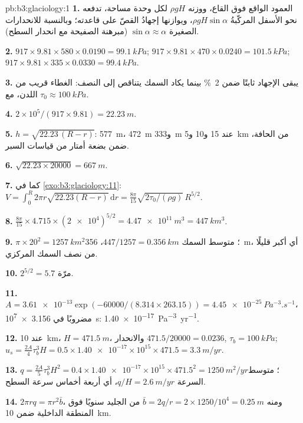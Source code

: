 \begin{solution}{pb:b3:glaciology:1}
\textbf{1.} العمود الواقع فوق القاع، ووزنه $\rho gH$ لكل وحدة مساحة، تدفعه
نحو الأسفل المركّبةُ $\rho gH\sin\alpha$، ويوازنها إجهادُ
القصّ على قاعدته؛ وبالنسبة للانحدارات الصغيرة $\sin\alpha \approx \alpha$ (مبرهنة
الصفيحة مع انحدار السطح).

\textbf{2.} $917\times9.81\times580\times0.0190 = \qty{99.1}{kPa}$;
$917\times9.81\times470\times0.0240 = \qty{101.5}{kPa}$; $917\times9.81
\times335\times0.0330 = \qty{99.4}{kPa}$.

\textbf{3.} يبقى الإجهاد ثابتًا ضمن \qty{2}{\percent} بينما
يكاد السمك يتناقص إلى النصف: الغطاء قريب من اللدن، مع $\tau_0 \approx
\qty{100}{kPa}$.

\textbf{4.} $2\times10^5/(917\times9.81) = \qty{22.23}{m}$.

\textbf{5.} $h = \sqrt{22.23\,(R - r)}$: \qty{577}{m}، \qty{472}{m}
و\qty{333}{m} عند 15 و10 و\qty{5}{km} من الحافة، ضمن بضعة أمتار
من قياسات السبر.

\textbf{6.} $\sqrt{22.23\times20000} = \qty{667}{m}$.

\textbf{7.} كما في \cref{exo:b3:glaciology:11}: $V = \int_0^R2\pi r
\sqrt{22.23(R - r)}\,\mathrm dr = \frac{8\pi}{15}\sqrt{2\tau_0/(\rho
g)}\,R^{5/2}$.

\textbf{8.} $\frac{8\pi}{15}\times4.715\times(\num{2e4})^{5/2} =
\qty{4.47e11}{m^3} = \qty{447}{km^3}$.

\textbf{9.} $\pi\times20^2 = \qty{1257}{km^2}$؛ متوسط السمك
$447/1257 = \qty{0.356}{km}$، \qty{356}{m}، أي أكبر قليلًا من نصف
السمك المركزي.

\textbf{10.} $2^{5/2} = 5.7$ مرّة.

\textbf{11.} $A = \num{3.61e-13}\exp(-60000/(8.314\times263.15)) =
\qty{4.45e-25}{Pa^{-3}.s^{-1}}$، مضروبًا في \qty{3.156e7}{s}:
\qty{1.40e-17}{Pa^{-3}.yr^{-1}}.

\textbf{12.} عند \qty{10}{km}، $H = \qty{471.5}{m}$، والانحدار $471.5/20000 =
\num{0.0236}$, $\tau_b = \qty{100}{kPa}$; $u_s = \tfrac{2A}{4}\tau_b^3H =
0.5\times\num{1.40e-17}\times10^{15}\times471.5 = \qty{3.3}{m/yr}$.

\textbf{13.} $q = \tfrac{2A}{5}\tau_b^3H^2 = 0.4\times\num{1.40e-17}
\times10^{15}\times471.5^2 = \qty{1250}{m^2/yr}$؛ متوسط السرعة $q/H =
\qty{2.6}{m/yr}$، أي أربعة أخماس سرعة السطح.

\textbf{14.} $2\pi rq = \pi r^2\bar b$، ومنه $\bar b = 2q/r = 2\times1250/10^4
= \qty{0.25}{m}$ من الجليد سنويًا فوق المنطقة الداخلية ضمن \qty{10}{km}.


\end{solution}
